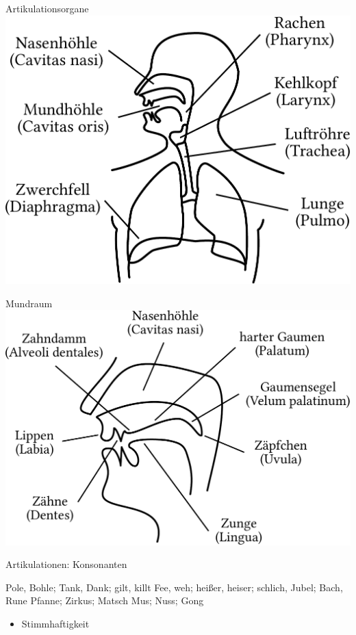 \begin{frame}
  {Artikulationsorgane}
  \pause
  \centering
  \includegraphics[height=0.7\textheight]{graphics/ueberblick}
\end{frame}

\begin{frame}
  {Mundraum}
  \pause
  \centering
  \includegraphics[height=0.7\textheight]{graphics/mundraum}
\end{frame}

\begin{frame}
  {Artikulationen: Konsonanten}
  \pause
    \begin{exe}
      \ex \alert{P}ole, \alert{B}ohle; \alert{T}ank, \alert{D}ank; \alert{g}ilt, \alert{k}illt
      \pause
      \ex \alert{F}ee, \alert{w}eh; hei\alert{ß}er, hei\alert{s}er; schli\alert{ch}, \alert{J}ubel; Ba\alert{ch}, \alert{R}une
      \pause
      \ex \alert{Pf}anne; \alert{Z}irkus; Ma\alert{tsch}
      \pause
      \ex \alert{M}us; \alert{N}uss; Go\alert{ng}
    \end{exe}
    \pause
    \Large
    \begin{itemize}
      \item \alert{Stimmhaftigkeit}
    \end{itemize}
\end{frame}


